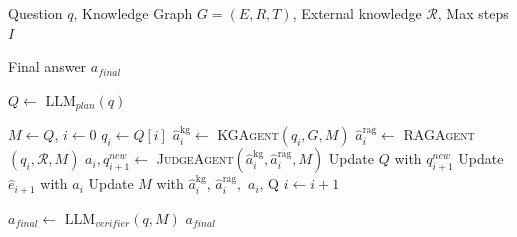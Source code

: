 \begin{algorithm}[h]
\caption{Debate over Mixed-knowledge (DoM) Framework}
\label{alg:dom_overview}
\begin{algorithmic}[1]
\REQUIRE Question $q$, Knowledge Graph $G = (E, R, T)$, External knowledge $\mathcal{R}$, Max steps $I$

\ENSURE Final answer $a_{final}$


\STATE $Q \leftarrow$ $\text{LLM}_{plan}(q)$ 

\STATE $M \leftarrow Q$,  
\STATE $i \leftarrow 0$
    \STATE $q_i \leftarrow Q[i]$ 
    \STATE $\hat{a}_i^{\text{kg}} \leftarrow$ \textsc{KGAgent}$(q_i, G, M)$
    \STATE $\hat{a}_i^{\text{rag}} \leftarrow$ \textsc{RAGAgent}$(q_i, \mathcal{R}, M)$
    \STATE $a_i, q_{i+1}^{new} \leftarrow$ \textsc{JudgeAgent}$(\hat{a}_i^{\text{kg}}, \hat{a}_i^{\text{rag}}, M)$
    \STATE Update $Q$ with $q_{i+1}^{new}$
    \STATE Update $\hat{e}_{i+1}$ with $a_i$
    \STATE Update $M$ with $\hat{a}_i^{\text{kg}}$, $\hat{a}_i^{\text{rag}},$ $a_i$, Q
    \STATE $i \leftarrow i + 1$
\ENDWHILE

\STATE $a_{final} \leftarrow$ $\text{LLM}_{verifier}(q, M)$
\RETURN $a_{final}$




\end{algorithmic}
\end{algorithm}
